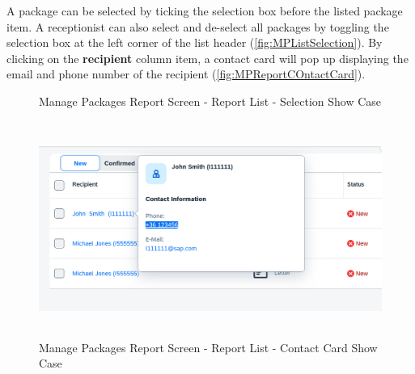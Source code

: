 A package can be selected by ticking the selection box before the listed package item. A receptionist can also select and de-select all packages by toggling the selection box at the left corner of the list header (\autoref{fig:MPListSelection}).
By clicking on the \textbf{recipient} column item, a contact card will pop up displaying  the email and phone number of the recipient (\autoref{fig:MPReportCOntactCard}).

\bigskip
\begin{figure}[htb!]
	\centering
  
	\vspace{10pt}
    \caption{Manage Packages Report Screen - Report List - Selection Show Case}
	\label{fig:MPListSelection}
\end{figure}

\begin{figure}[htb]
	\centering
	\includegraphics[height=200pt]{images/user_doc/managePack/ReportScreen/browse/contactcard.png}
	\caption{Manage Packages Report Screen - Report List - Contact Card Show Case}
	\label{fig:MPReportCOntactCard}
\end{figure}

